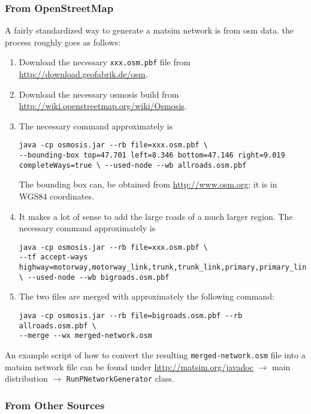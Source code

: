 \subsubsection{From OpenStreetMap}
\label{sec:network-from-osm}

A fairly standardized way to generate a \gls{matsim} network is from \gls{osm} data.  the process roughly goes as follows:
\begin{enumerate}

\item Download the necessary \lstinline{xxx.osm.pbf} file from \url{http://download.geofabrik.de/osm}.

\item Download the necessary \gls{osmosis} build from \url{http://wiki.openstreetmap.org/wiki/Osmosis}.

\item The necessary command approximately is
\begin{lstlisting}
java -cp osmosis.jar --rb file=xxx.osm.pbf \
--bounding-box top=47.701 left=8.346 bottom=47.146 right=9.019 completeWays=true \ --used-node --wb allroads.osm.pbf
\end{lstlisting}
The bounding box can, \eg be obtained from \url{http://www.osm.org}; it is in WGS84 coordinates.

\item It makes a lot of sense to add the large roads of a much larger region.  The necessary command approximately is
\begin{lstlisting}
java -cp osmosis.jar --rb file=xxx.osm.pbf \
--tf accept-ways highway=motorway,motorway_link,trunk,trunk_link,primary,primary_link \ --used-node --wb bigroads.osm.pbf
\end{lstlisting}

\item The two files are merged with approximately the following command:
\begin{lstlisting}
java -cp osmosis.jar --rb file=bigroads.osm.pbf --rb allroads.osm.pbf \
--merge --wx merged-network.osm
\end{lstlisting}

\end{enumerate}
An example script of how to convert the resulting \lstinline{merged-network.osm} file into a \gls{matsim} network file can be found under \url{http://matsim.org/javadoc} $\to$ main distribution $\to$ \lstinline{RunPNetworkGenerator} class.

\subsubsection{From Other Sources}


